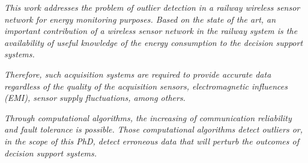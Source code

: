 
\textit{
This work addresses the problem of outlier detection in a railway wireless sensor network for energy monitoring purposes. 
Based on the state of the art, an important contribution of a wireless sensor network in the railway system is the availability of useful knowledge of the energy consumption to the decision support systems.
}

\textit{
Therefore, such acquisition systems are required to provide accurate data regardless of the quality of the acquisition sensors, electromagnetic influences (EMI), sensor supply fluctuations, among others.
}

\textit{
Through computational algorithms, the increasing of communication reliability and fault tolerance is possible. Those computational algorithms detect outliers or, in the scope of this PhD, detect erroneous data that will perturb the outcomes of decision support systems. 
}